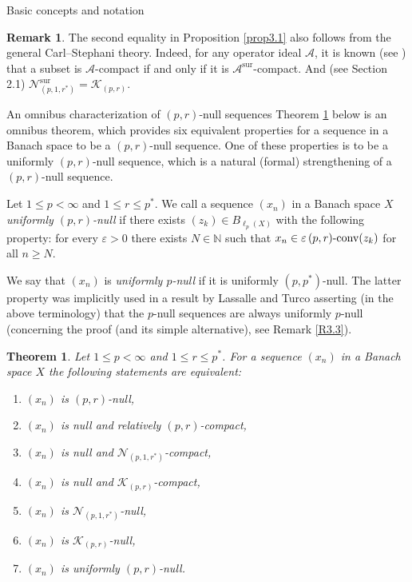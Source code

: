 \documentclass[a4paper,11pt]{amsart}
\newtheorem{thm}[prop]{Theorem}
\theoremstyle{definition}
\newtheorem{rem}[prop]{Remark}
\theoremstyle{definition}
\theoremstyle{definition}
\begin{document}
\begin{section}{Basic concepts and notation}
\begin{rem}
The second equality in Proposition \ref{prop3.1} also follows from the general Carl--Stephani theory. Indeed, for any operator ideal ${{\mathcal A}}$, it is known (see \cite[p.~79]{CS}) that a subset is ${{\mathcal A}}$-compact if and only if it is ${{\mathcal A}}^ \mathrm{sur}$-compact. And (see Section 2.1) ${{\mathcal N}}_{(p,1,{r^{\ast}})}^\mathrm{sur}={{\mathcal K}}_{{(p,r)}}$.
\end{rem}
\end{section}

\begin{section}{An omnibus characterization of $(p,r)$-null sequences}
Theorem \ref{omni} below is an omnibus theorem, which provides six equivalent properties for a sequence in a Banach space to be a ${{(p,r)}}$-null sequence. One of these properties is to be a uniformly ${{(p,r)}}$-null sequence, which is a natural (formal) strengthening of a ${{(p,r)}}$-null sequence.

Let $1 \leq p < \infty$ and $1\leq r \leq {p^{\ast}}$. We call a sequence $(x_n)$ in a Banach space $X$ \emph{uniformly ${{(p,r)}}$-null} if there exists $(z_k) \in B_{\ell_p(X)}$ with the following property: for every ${\varepsilon} >0$ there exists $N \in {{\mathbb N}}$ such that $x_n \in {\varepsilon} \, (p,r)\textnormal{-conv}(z_k)$ for all $n\geq N$. 

We say that $(x_n)$ is \emph{uniformly $p$-null} if it is uniformly $(p,{p^{\ast}})$-null. The latter property was implicitly used in a result by Lassalle and Turco asserting (in the above terminology) that the $p$-null sequences are always uniformly $p$-null (concerning the proof (and its simple alternative), see Remark \ref{R3.3}).

\begin{thm}\label{omni}
Let $1 \leq p < \infty$ and $1 \leq r \leq {p^{\ast}}$. For a sequence $(x_n)$ in a Banach space $X$ the following statements are equivalent:
\begin{enumerate}
\item $(x_n)$ is $(p,r)$-null,
\item $(x_n)$ is null and relatively $(p,r)$-compact,
\item $(x_n)$ is null and ${{\mathcal N}}_{(p,1,{r^{\ast}})}$-compact,
\item $(x_n)$ is null and ${{\mathcal K}}_{(p,r)}$-compact,
\item $(x_n)$ is ${{\mathcal N}}_{(p,1,{r^{\ast}})}$-null,
\item $(x_n)$ is ${{\mathcal K}}_{(p,r)}$-null,
\item $(x_n)$ is uniformly $(p,r)$-null.
\end{enumerate}
\end{thm}


\end{section}
\end{document}
